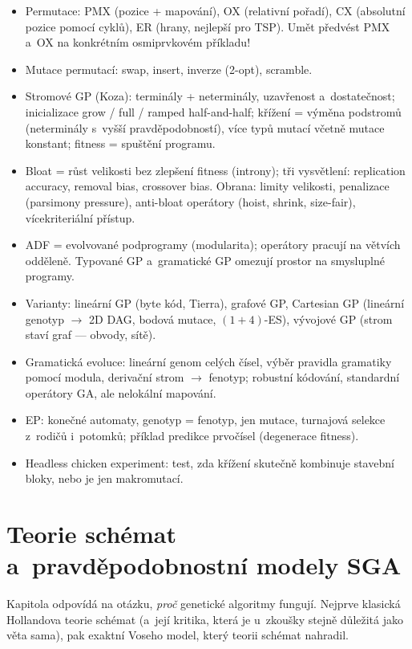 \documentclass[11pt,a4paper]{article}
\theoremstyle{definition}
\begin{document}
\begin{itemize}
  aritmetické křížení $\alpha \vec x + (1-\alpha)\vec y$ (zmenšuje rozptyl),
  proto BLX-$\alpha$ a~SBX.
\item Permutace: PMX (pozice + mapování), OX (relativní pořadí),
  CX (absolutní pozice pomocí cyklů), ER (hrany, nejlepší pro TSP).
  Umět předvést PMX a~OX na konkrétním osmiprvkovém příkladu!
\item Mutace permutací: swap, insert, inverze (2-opt), scramble.
\item Stromové GP (Koza): terminály + neterminály, uzavřenost a~dostatečnost;
  inicializace grow / full / ramped half-and-half; křížení = výměna podstromů
  (neterminály s~vyšší pravděpodobností), více typů mutací včetně mutace
  konstant; fitness = spuštění programu.
\item Bloat = růst velikosti bez zlepšení fitness (introny); tři vysvětlení:
  replication accuracy, removal bias, crossover bias. Obrana: limity
  velikosti, penalizace (parsimony pressure), anti-bloat operátory
  (hoist, shrink, size-fair), vícekriteriální přístup.
\item ADF = evolvované podprogramy (modularita); operátory pracují na větvích
  odděleně. Typované GP a~gramatické GP omezují prostor na smysluplné programy.
\item Varianty: lineární GP (byte kód, Tierra), grafové GP,
  Cartesian GP (lineární genotyp $\to$ 2D DAG, bodová mutace, $(1+4)$-ES),
  vývojové GP (strom staví graf --- obvody, sítě).
\item Gramatická evoluce: lineární genom celých čísel, výběr pravidla
  gramatiky pomocí modula, derivační strom $\to$ fenotyp; robustní kódování,
  standardní operátory GA, ale nelokální mapování.
\item EP: konečné automaty, genotyp = fenotyp, jen mutace, turnajová selekce
  z~rodičů i~potomků; příklad predikce prvočísel (degenerace fitness).
\item Headless chicken experiment: test, zda křížení skutečně kombinuje
  stavební bloky, nebo je jen makromutací.
\end{itemize}

\section{Teorie schémat a~pravděpodobnostní modely SGA}
\label{sec:schemata}

Kapitola odpovídá na otázku, \emph{proč} genetické algoritmy fungují. Nejprve klasická
Hollandova teorie schémat (a~její kritika, která je u~zkoušky stejně důležitá jako věta
sama), pak exaktní Voseho model, který teorii schémat nahradil.
\end{document}

